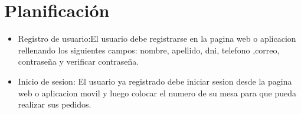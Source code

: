 \chapter{Planificación}
\begin{itemize}
	\item Registro de usuario:El usuario debe registrarse en la pagina web o aplicacion rellenando los siguientes campos: nombre, apellido, dni, telefono ,correo, contraseña y verificar contraseña.
	\item Inicio de sesion: El usuario ya registrado debe iniciar sesion desde la pagina web o aplicacion movil y luego colocar el numero de su mesa para que pueda realizar sus pedidos.
\end{itemize}

